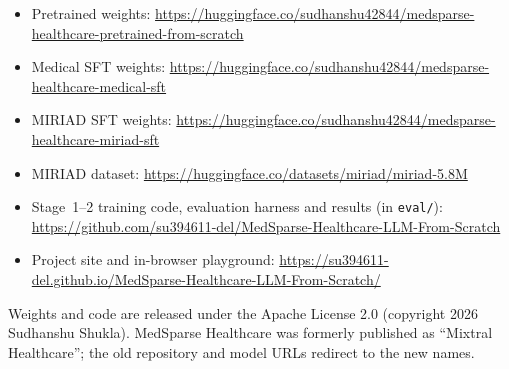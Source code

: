 \documentclass[11pt,a4paper]{article}
\begin{document}
\begin{itemize}
  \item Pretrained weights: \url{https://huggingface.co/sudhanshu42844/medsparse-healthcare-pretrained-from-scratch}
  \item Medical SFT weights: \url{https://huggingface.co/sudhanshu42844/medsparse-healthcare-medical-sft}
  \item MIRIAD SFT weights: \url{https://huggingface.co/sudhanshu42844/medsparse-healthcare-miriad-sft}
  \item MIRIAD dataset: \url{https://huggingface.co/datasets/miriad/miriad-5.8M}
  \item Stage~1--2 training code, evaluation harness and results (in \texttt{eval/}): \url{https://github.com/su394611-del/MedSparse-Healthcare-LLM-From-Scratch}
  \item Project site and in-browser playground: \url{https://su394611-del.github.io/MedSparse-Healthcare-LLM-From-Scratch/}
\end{itemize}
Weights and code are released under the Apache License 2.0 (copyright 2026 Sudhanshu Shukla). MedSparse Healthcare was formerly published as ``Mixtral Healthcare''; the old repository and model URLs redirect to the new names.
\end{document}
